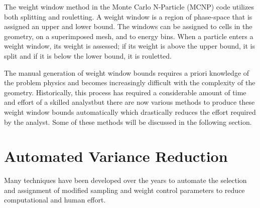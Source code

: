 The weight window method in the Monte Carlo N-Particle (MCNP) code utilizes both
splitting and rouletting.  A weight window is a region of phase-space that is 
assigned an upper and lower bound.  The windows can be assigned to cells in the
geometry, on a superimposed mesh, and to energy bins.  When a particle enters
a weight window, its weight is assessed; if its weight is above the upper bound,
it is split and if it is below the lower bound, it is rouletted.  

The manual generation of weight window bounds requires a priori knowledge of the problem physics and becomes increasingly difficult with the complexity of the geometry. 
Historically, this process has required a considerable amount of time and effort of a skilled analystbut there are now various
methods to produce these weight window bounds automatically which drastically reduces the
effort required by the analyst.  Some of these methods will 
be discussed in the following section.


\section{Automated Variance Reduction}\label{sec:auto_vr}

Many techniques have been developed over the years to automate the selection and
assignment of modified sampling and weight control parameters to reduce computational and human effort.

